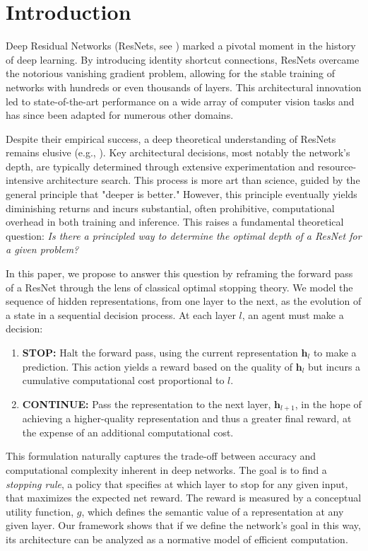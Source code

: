 \documentclass[12pt]{imsart}
\newcommand{\h}{\mathbf{h}}
\theoremstyle{plain}
\theoremstyle{definition}
\begin{document}
\section{Introduction}

Deep Residual Networks (ResNets, see \cite{He2016}) marked a pivotal moment in the history of deep learning. By introducing identity shortcut connections, ResNets overcame the notorious vanishing gradient problem, allowing for the stable training of networks with hundreds or even thousands of layers. This architectural innovation led to state-of-the-art performance on a wide array of computer vision tasks and has since been adapted for numerous other domains.

Despite their empirical success, a deep theoretical understanding of ResNets remains elusive (e.g., \cite{han2019mean,Hanin19MeanField,Li22Deep,qian2025}). Key architectural decisions, most notably the network's depth, are typically determined through extensive experimentation and resource-intensive architecture search. This process is more art than science, guided by the general principle that "deeper is better." However, this principle eventually yields diminishing returns and incurs substantial, often prohibitive, computational overhead in both training and inference. This raises a fundamental theoretical question: \textit{Is there a principled way to determine the optimal depth of a ResNet for a given problem?}

In this paper, we propose to answer this question by reframing the forward pass of a ResNet through the lens of classical optimal stopping theory. We model the sequence of hidden representations, from one layer to the next, as the evolution of a state in a sequential decision process. At each layer $l$, an agent must make a decision:
\begin{enumerate}
    \item \textbf{STOP:} Halt the forward pass, using the current representation $\h_l$ to make a prediction. This action yields a reward based on the quality of $\h_l$ but incurs a cumulative computational cost proportional to $l$.
    \item \textbf{CONTINUE:} Pass the representation to the next layer, $\h_{l+1}$, in the hope of achieving a higher-quality representation and thus a greater final reward, at the expense of an additional computational cost.
\end{enumerate}
This formulation naturally captures the trade-off between accuracy and computational complexity inherent in deep networks. The goal is to find a \textit{stopping rule}, a policy that specifies at which layer to stop for any given input, that maximizes the expected net reward. The reward is measured by a conceptual utility function, $g$, which defines the semantic value of a representation at any given layer. Our framework shows that if we define the network's goal in this way, its architecture can be analyzed as a normative model of efficient computation.
\end{document}
